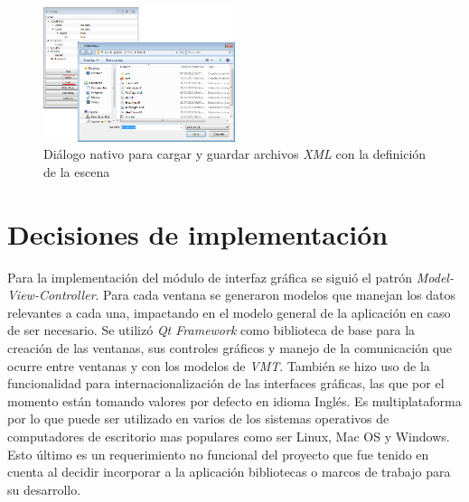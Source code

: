 \begin{figure}[H]
  \centering
    \includegraphics[width=0.5\textwidth]{./Cap5_vmt/vmt_loadShow.png}
  \caption{Diálogo nativo para cargar y guardar archivos \emph{XML} con la definición de la escena}
  \label{fig:VMT-XML}
\end{figure}

\section{Decisiones de implementación}
Para la implementación del módulo de interfaz gráfica se siguió el patrón \emph{Model-View-Controller}. Para cada ventana se generaron modelos que manejan los datos relevantes a cada una, impactando en el modelo general de la aplicación en caso de ser necesario.
Se utilizó \emph{Qt Framework}\cite{Qt-framework} como biblioteca de base para la creación de las ventanas, sus controles gráficos y manejo de la comunicación que ocurre entre ventanas y con los modelos de \emph{VMT}. También se hizo uso de la funcionalidad para internacionalización de las interfaces gráficas, las que por el momento están tomando valores por defecto en idioma Inglés. Es multiplataforma por lo que puede ser utilizado en varios de los sistemas operativos de computadores de escritorio mas populares como ser Linux, Mac OS y Windows. Esto último es un requerimiento no funcional del proyecto que fue tenido en cuenta al decidir incorporar a la aplicación bibliotecas o marcos de trabajo para su desarrollo.
